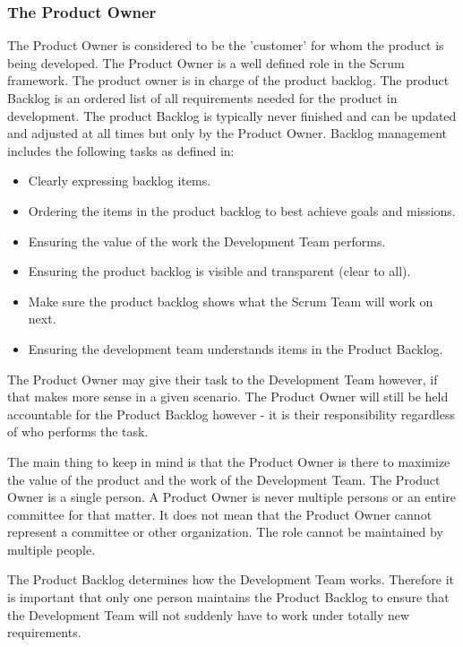 \subsubsection{The Product Owner}


The Product Owner is considered to be the 'customer' for whom the product is being developed.
The Product Owner is a well defined role in the Scrum framework. The product owner is in
charge of the product backlog\cite{scrumguide11}. The product Backlog is an ordered list of
all requirements needed for the product in development. The product Backlog is typically
never finished and can be updated and adjusted at all times but only by the Product
Owner\cite{scrumguide11}. Backlog management includes the following tasks as defined
in\cite{scrumguide11}:

\begin{itemize}
	\item Clearly expressing backlog items.
	\item	Ordering the items in the product backlog to best achieve goals and missions.
	\item	Ensuring the value of the work the Development Team performs.
	\item	Ensuring the product backlog is visible and transparent (clear to all).
	\item	Make sure the product backlog shows what the Scrum Team will work on next.
	\item	Ensuring the development team understands items in the Product Backlog.
\end{itemize}


The Product Owner may give their task to the Development Team however, if that makes more
sense in a given scenario\cite{scrumguide11}. The Product Owner will still be held
accountable for the Product Backlog however - it is their responsibility regardless of who
performs the task\cite{scrumguide11}.


The main thing to keep in mind is that the Product Owner is there to maximize the value of
the product and the work of the Development Team\cite{scrumguide11}.  The Product Owner is a
single person. A Product Owner is never multiple persons or an entire committee for that
matter. It does not mean that the Product Owner cannot represent a committee or other
organization\cite{scrumguide11}. The role cannot be maintained by multiple
people\cite{scrumguide11}.


The Product Backlog determines how the Development Team works. Therefore it is important
that only one person maintains the Product Backlog to ensure that the Development Team will
not suddenly have to work under totally new requirements\cite{scrumguide11}.